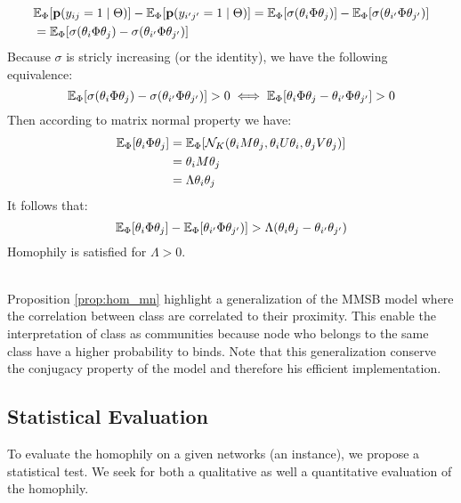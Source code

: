 \begin{align}
&\mathbb{E}_{\Phi}[\mathbf{p}(y_{ij}=1\mid \Theta)] - \mathbb{E}_{\Phi}[\mathbf{p}(y_{i'j'}=1\mid \Theta)] =  \mathbb{E}_{\Phi}[\sigma(\theta_i \Phi \theta_j)] -  \mathbb{E}_{\Phi}[\sigma(\theta_{i'} \Phi \theta_{j'})] \\
&= \mathbb{E}_{\Phi}[\sigma(\theta_i \Phi \theta_j) - \sigma(\theta_{i'} \Phi \theta_{j'})]
\end{align}
Because $\sigma$ is stricly increasing (or the identity), we have the following equivalence:
\begin{equation}
\mathbb{E}_{\Phi}[\sigma(\theta_i \Phi \theta_j) - \sigma(\theta_{i'} \Phi \theta_{j'})] > 0  \iff \mathbb{E}_{\Phi}[\theta_i \Phi \theta_j - \theta_{i'} \Phi \theta_{j'}] > 0 
\end{equation}
Then according to matrix normal property we have:
\begin{align}
\mathbb{E}_{\Phi}[\theta_i \Phi \theta_j] &= \mathbb{E}_{\Phi}[\mathcal{N}_K(\theta_iM\theta_j, \theta_iU\theta_i, \theta_jV\theta_j)] \\
&= \theta_iM\theta_j \\
&= \Lambda \theta_i \theta_j
\end{align}
It follows that:  
\begin{equation}
\mathbb{E}_{\Phi}[\theta_i \Phi \theta_j] - \mathbb{E}_{\Phi}[\theta_{i'} \Phi \theta_{j'})] > \Lambda (\theta_i \theta_j - \theta_{i'} \theta_{j'} )
\end{equation}
Homophily is satisfied for $\Lambda > 0$.

~\\

Proposition \ref{prop:hom_mn} highlight a generalization of the MMSB model where the correlation between class are correlated to their proximity. This enable the interpretation of class as communities because node who belongs to the same class have a higher probability to binds. Note that this generalization conserve the conjugacy property of the model and therefore his efficient implementation.

\subsection{Statistical Evaluation}
To evaluate the homophily on a given networks (an instance), we propose a statistical test. We seek for both a qualitative as well a quantitative evaluation of the homophily.

